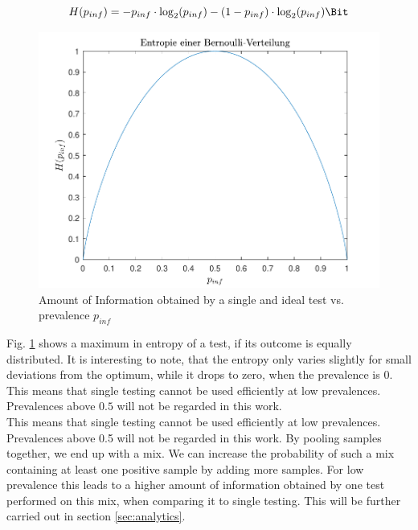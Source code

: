\documentclass[fleqn,10pt]{wlscirep}
\begin{document}
\begin{ceqn}
\begin{equation}
H(p_{inf}) = -p_{inf} \cdot \log_2(p_{inf})-(1-p_{inf}) \cdot \log_2(p_{inf}) \si{\Bit}
\end{equation}
\end{ceqn}

\begin{figure}[ht]
	\centering
	\includegraphics[]{pics/Bin_Entropie.pdf}
	\caption{Amount of Information obtained by a single and ideal test vs. prevalence $p_{inf}$}
	\label{fig:bin_entropie}
\end{figure}

Fig. \ref{fig:bin_entropie} shows a maximum in entropy of a test, if its outcome is equally distributed. It is interesting to note, that the entropy only varies slightly for small deviations from the optimum, while it drops to zero, when the prevalence is $0$. This means that single testing cannot be used efficiently at low prevalences. Prevalences above $0.5$ will not be regarded in this work.\\

This means that single testing cannot be used efficiently at low prevalences. Prevalences above 0.5 will not be regarded in this work. By pooling samples together, we end up with a mix. We can increase the probability of such a mix containing at least one positive sample by adding more samples. For low prevalence this leads to a higher amount of information obtained by one test performed on this mix, when comparing it to single testing.
This will be further carried out in section \ref{sec:analytics}.\\
\end{document}
